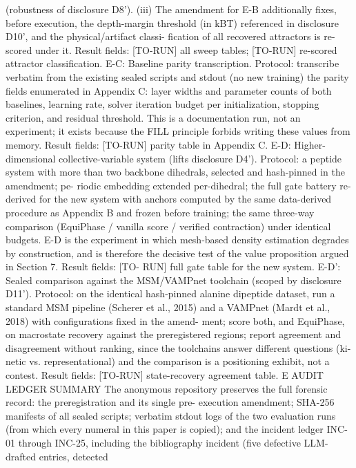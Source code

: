 \documentclass{article}
\begin{document}
(robustness of disclosure D8'). (iii) The amendment for E-B additionally fixes, before execution,
the depth-margin threshold (in kBT) referenced in disclosure D10', and the physical/artifact classi-
fication of all recovered attractors is re-scored under it. Result fields: [TO-RUN] all sweep tables;
[TO-RUN] re-scored attractor classification.
E-C: Baseline parity transcription.
Protocol: transcribe verbatim from the existing sealed
scripts and stdout (no new training) the parity fields enumerated in Appendix C: layer widths and
parameter counts of both baselines, learning rate, solver iteration budget per initialization, stopping
criterion, and residual threshold. This is a documentation run, not an experiment; it exists because
the FILL principle forbids writing these values from memory. Result fields: [TO-RUN] parity table
in Appendix C.
E-D: Higher-dimensional collective-variable system (lifts disclosure D4').
Protocol: a peptide
system with more than two backbone dihedrals, selected and hash-pinned in the amendment; pe-
riodic embedding extended per-dihedral; the full gate battery re-derived for the new system with
anchors computed by the same data-derived procedure as Appendix B and frozen before training;
the same three-way comparison (EquiPhase / vanilla score / verified contraction) under identical
budgets. E-D is the experiment in which mesh-based density estimation degrades by construction,
and is therefore the decisive test of the value proposition argued in Section 7. Result fields: [TO-
RUN] full gate table for the new system.
E-D': Sealed comparison against the MSM/VAMPnet toolchain (scoped by disclosure D11').
Protocol: on the identical hash-pinned alanine dipeptide dataset, run a standard MSM pipeline
(Scherer et al., 2015) and a VAMPnet (Mardt et al., 2018) with configurations fixed in the amend-
ment; score both, and EquiPhase, on macrostate recovery against the preregistered regions; report
agreement and disagreement without ranking, since the toolchains answer different questions (ki-
netic vs. representational) and the comparison is a positioning exhibit, not a contest. Result fields:
[TO-RUN] state-recovery agreement table.
E
AUDIT LEDGER SUMMARY
The anonymous repository preserves the full forensic record: the preregistration and its single pre-
execution amendment; SHA-256 manifests of all sealed scripts; verbatim stdout logs of the two
evaluation runs (from which every numeral in this paper is copied); and the incident ledger INC-01
through INC-25, including the bibliography incident (five defective LLM-drafted entries, detected
\end{document}

